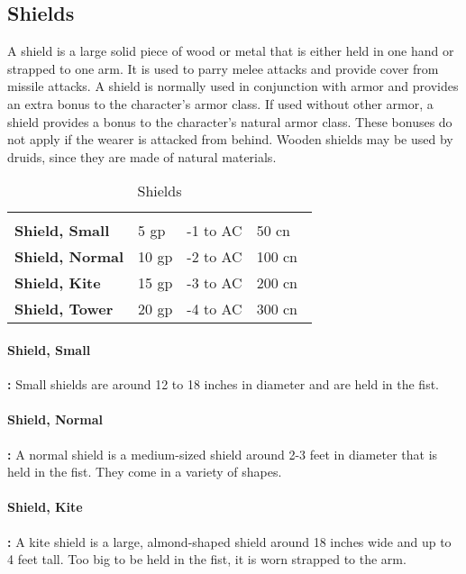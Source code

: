 \begin{multicols*}{2}
\section{Shields}
A shield is a large solid piece of wood or metal that is either held in one hand or strapped to one arm. It is used to parry melee attacks and provide cover from missile attacks. A shield is normally used in conjunction with armor and provides an extra bonus to the character’s armor class. If used without other armor, a shield provides a bonus to the character’s natural armor class. These bonuses do not apply if the wearer is attacked from behind. Wooden shields may be used by druids, since they are made of natural materials.

\begin {table}[H]
  \caption{Shields}
  \begin{tabularx}{\columnwidth}{>{\bfseries}YYYY}
		 &  &  & \\
		Shield, Small & 5 gp & -1 to AC & 50 cn\\
		Shield, Normal & 10 gp & -2 to AC & 100 cn\\
		Shield, Kite & 15 gp & -3 to AC & 200 cn\\
		Shield, Tower & 20 gp & -4 to AC & 300 cn\
  \end {tabularx}
\end {table}

\paragraph{Shield, Small}\textbf{:} Small shields are around 12 to 18 inches in diameter and are held in the fist.

\paragraph{Shield, Normal}\textbf{:} A normal shield is a medium-sized shield around 2-3 feet in diameter that is held in the fist. They come in a variety of shapes.

\paragraph{Shield, Kite}\textbf{:} A kite shield is a large, almond-shaped shield around 18 inches wide and up to 4 feet tall. Too big to be held in the fist, it is worn strapped to the arm.


\end{multicols*}

